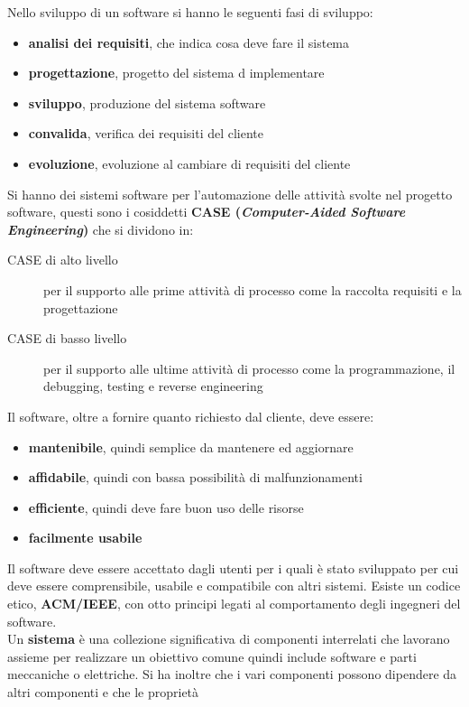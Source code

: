 \documentclass[a4paper,12pt, oneside]{book}
\begin{document}
Nello sviluppo di un software si hanno le seguenti fasi di sviluppo:
\begin{itemize}
\item \textbf{analisi dei requisiti}, che indica cosa deve fare il sistema
\item \textbf{progettazione}, progetto del sistema d implementare 
\item \textbf{sviluppo}, produzione del sistema software
\item \textbf{convalida}, verifica dei requisiti del cliente
\item \textbf{evoluzione}, evoluzione al cambiare di requisiti del cliente
\end{itemize} 
Si hanno dei sistemi software per l'automazione delle attività svolte nel progetto software, 
questi sono i cosiddetti \textbf{CASE (\textit{Computer-Aided Software Engineering})} che si dividono in:
\begin{description}
    \item [CASE di alto livello] per il supporto alle prime attività di processo come la raccolta requisiti e la progettazione
    \item [CASE di basso livello] per il supporto alle ultime attività di processo come la programmazione,
                                  il debugging, testing e reverse engineering
\end{description}
Il software, oltre a fornire quanto richiesto dal cliente, deve essere:
\begin{itemize}
\item \textbf{mantenibile}, quindi semplice da mantenere ed aggiornare
\item \textbf{affidabile}, quindi con bassa possibilità di malfunzionamenti
\item \textbf{efficiente}, quindi deve fare buon uso delle risorse
\item \textbf{facilmente usabile}
\end{itemize}
Il software deve essere accettato dagli utenti per i quali è stato sviluppato per cui deve essere comprensibile, 
usabile e compatibile con altri sistemi.
Esiste un codice etico, \textbf{ACM/IEEE}, con otto principi legati al comportamento degli ingegneri del software.\\
Un \textbf{sistema} è una collezione significativa di componenti interrelati che lavorano assieme per realizzare
un obiettivo comune quindi include software e parti meccaniche o elettriche.
Si ha inoltre che i vari componenti possono dipendere da altri componenti e che le proprietà
\end{document}
